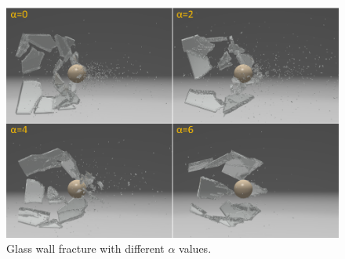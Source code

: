 \begin{figure}[t]
  \centering
  \includegraphics[width=\linewidth]{../figs/revision/demo_shatter_control.png}
  \caption{\label{fig:7_after}
  Glass wall fracture with different $\alpha$ values.
}
\end{figure}
